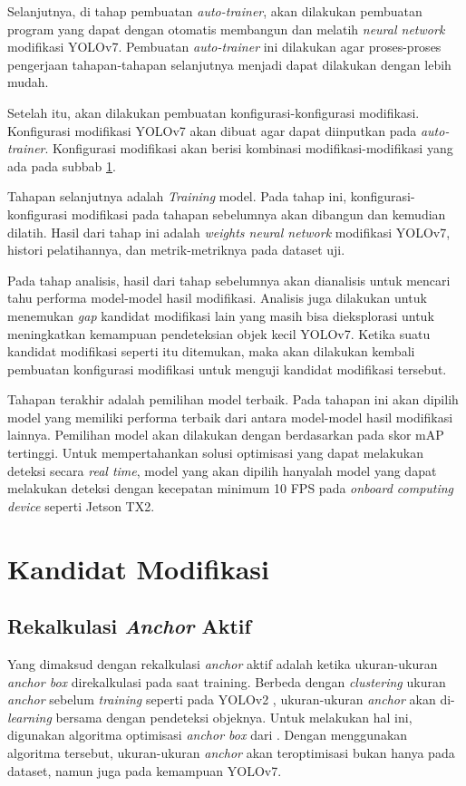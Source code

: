  Selanjutnya, di tahap pembuatan \emph{auto-trainer}, akan dilakukan pembuatan program yang dapat dengan otomatis membangun dan melatih \emph{neural network} modifikasi YOLOv7.
  Pembuatan \emph{auto-trainer} ini dilakukan agar proses-proses pengerjaan tahapan-tahapan selanjutnya menjadi dapat dilakukan dengan lebih mudah.

  Setelah itu, akan dilakukan pembuatan konfigurasi-konfigurasi modifikasi.
  Konfigurasi modifikasi YOLOv7 akan dibuat agar dapat diinputkan pada \emph{auto-trainer}.
  Konfigurasi modifikasi akan berisi kombinasi modifikasi-modifikasi yang ada pada subbab \ref{section:modificationcandidates}.

  Tahapan selanjutnya adalah \emph{Training} model.
  Pada tahap ini, konfigurasi-konfigurasi modifikasi pada tahapan sebelumnya akan dibangun dan kemudian dilatih.
  Hasil dari tahap ini adalah \emph{weights neural network} modifikasi YOLOv7, histori pelatihannya, dan metrik-metriknya pada dataset uji.

  Pada tahap analisis, hasil dari tahap sebelumnya akan dianalisis untuk mencari tahu performa model-model hasil modifikasi.
  Analisis juga dilakukan untuk menemukan \emph{gap} kandidat modifikasi lain yang masih bisa dieksplorasi untuk meningkatkan kemampuan pendeteksian objek kecil YOLOv7.
  Ketika suatu kandidat modifikasi seperti itu ditemukan, maka akan dilakukan kembali pembuatan konfigurasi modifikasi untuk menguji kandidat modifikasi tersebut.

  Tahapan terakhir adalah pemilihan model terbaik.
  Pada tahapan ini akan dipilih model yang memiliki performa terbaik dari antara model-model hasil modifikasi lainnya.
  Pemilihan model akan dilakukan dengan berdasarkan pada skor mAP tertinggi.
  Untuk mempertahankan solusi optimisasi yang dapat melakukan deteksi secara \emph{real time}, model yang akan dipilih hanyalah model yang dapat melakukan deteksi dengan kecepatan minimum 10 FPS pada \emph{onboard computing device} seperti Jetson TX2.


\section{Kandidat Modifikasi}
\label{section:modificationcandidates}
  \subsection{Rekalkulasi \emph{Anchor} Aktif}
    Yang dimaksud dengan rekalkulasi \emph{anchor} aktif adalah ketika ukuran-ukuran \emph{anchor box} direkalkulasi pada saat training.
    Berbeda dengan \emph{clustering} ukuran \emph{anchor} sebelum \emph{training} seperti pada YOLOv2 \parencite{yolov2}, ukuran-ukuran \emph{anchor} akan di-\emph{learning} bersama dengan pendeteksi objeknya.
    Untuk melakukan hal ini, digunakan algoritma optimisasi \emph{anchor box} dari \textcite{anchoropt}.
    Dengan menggunakan algoritma tersebut, ukuran-ukuran \emph{anchor} akan teroptimisasi bukan hanya pada dataset, namun juga pada kemampuan YOLOv7.
